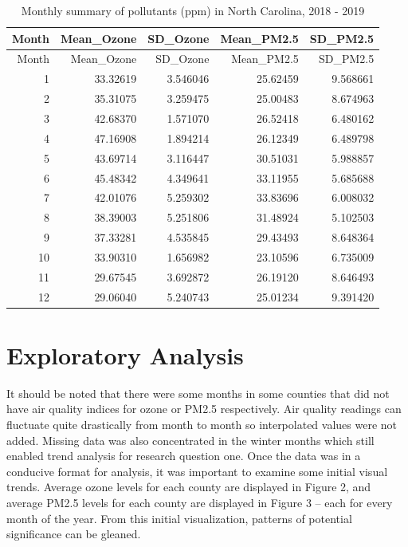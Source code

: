 \documentclass[
  12pt,
]{article}
\begin{document}
\begin{longtable}[]{@{}rrrrr@{}}
\caption{Monthly summary of pollutants (ppm) in North Carolina, 2018 -
2019}\tabularnewline
\toprule
Month & Mean\_Ozone & SD\_Ozone & Mean\_PM2.5 & SD\_PM2.5 \\
\midrule
\endfirsthead
\toprule
Month & Mean\_Ozone & SD\_Ozone & Mean\_PM2.5 & SD\_PM2.5 \\
\midrule
\endhead
1 & 33.32619 & 3.546046 & 25.62459 & 9.568661 \\
2 & 35.31075 & 3.259475 & 25.00483 & 8.674963 \\
3 & 42.68370 & 1.571070 & 26.52418 & 6.480162 \\
4 & 47.16908 & 1.894214 & 26.12349 & 6.489798 \\
5 & 43.69714 & 3.116447 & 30.51031 & 5.988857 \\
6 & 45.48342 & 4.349641 & 33.11955 & 5.685688 \\
7 & 42.01076 & 5.259302 & 33.83696 & 6.008032 \\
8 & 38.39003 & 5.251806 & 31.48924 & 5.102503 \\
9 & 37.33281 & 4.535845 & 29.43493 & 8.648364 \\
10 & 33.90310 & 1.656982 & 23.10596 & 6.735009 \\
11 & 29.67545 & 3.692872 & 26.19120 & 8.646493 \\
12 & 29.06040 & 5.240743 & 25.01234 & 9.391420 \\
\bottomrule
\end{longtable}

\newpage

\hypertarget{exploratory-analysis}{%
\section{Exploratory Analysis}\label{exploratory-analysis}}

It should be noted that there were some months in some counties that did
not have air quality indices for ozone or PM2.5 respectively. Air
quality readings can fluctuate quite drastically from month to month so
interpolated values were not added. Missing data was also concentrated
in the winter months which still enabled trend analysis for research
question one. Once the data was in a conducive format for analysis, it
was important to examine some initial visual trends. Average ozone
levels for each county are displayed in Figure 2, and average PM2.5
levels for each county are displayed in Figure 3 -- each for every month
of the year. From this initial visualization, patterns of potential
significance can be gleaned.
\end{document}
